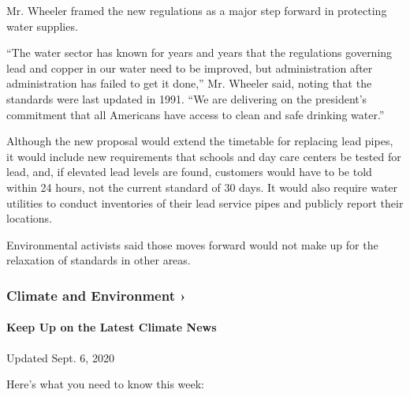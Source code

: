 Mr. Wheeler framed the new regulations as a major step forward in
protecting water supplies.

``The water sector has known for years and years that the regulations
governing lead and copper in our water need to be improved, but
administration after administration has failed to get it done,'' Mr.
Wheeler said, noting that the standards were last updated in 1991. ``We
are delivering on the president's commitment that all Americans have
access to clean and safe drinking water.''

Although the new proposal would extend the timetable for replacing lead
pipes, it would include new requirements that schools and day care
centers be tested for lead, and, if elevated lead levels are found,
customers would have to be told within 24 hours, not the current
standard of 30 days. It would also require water utilities to conduct
inventories of their lead service pipes and publicly report their
locations.

Environmental activists said those moves forward would not make up for
the relaxation of standards in other areas.

\href{\%3Ca\%20href=\%22https://www.nytimes3xbfgragh.onion/section/climate?action=click\&pgtype=Article\&state=default\&region=MAIN_CONTENT_1\&context=storylines_keepup\%22\%3Ehttps://www.nytimes3xbfgragh.onion/section/climate?action=click\&pgtype=Article\&state=default\&region=MAIN_CONTENT_1\&context=storylines_keepup\%3C/a\%3E}{}

\hypertarget{climate-and-environment-}{%
\subsubsection{Climate and Environment
›}\label{climate-and-environment-}}

\hypertarget{keep-up-on-the-latest-climate-news}{%
\paragraph{Keep Up on the Latest Climate
News}\label{keep-up-on-the-latest-climate-news}}

Updated Sept. 6, 2020

Here's what you need to know this week:

